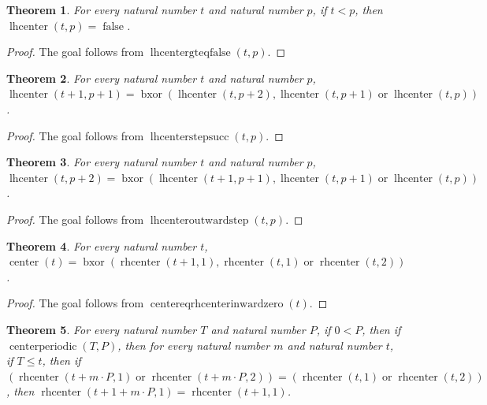 \documentclass[11pt]{article}
\newtheorem{theorem}{Theorem}[section]
\theoremstyle{definition}
\begin{document}
\begin{theorem}
\label{ll:paper:lhcenter-gt-eq-false}
For every natural number \(t\) and natural number \(p\), if \(t < p\), then \(\operatorname{lhcenter}(t, p) = \operatorname{false}\).
\end{theorem}
\begin{proof}
The goal follows from \(\operatorname{lhcentergteqfalse}(t, p)\).
\end{proof}
\begin{theorem}
\label{ll:paper:lhcenter-step-succ}
For every natural number \(t\) and natural number \(p\), \(\operatorname{lhcenter}(t + 1, p + 1) = \operatorname{bxor}(\operatorname{lhcenter}(t, p + 2), \operatorname{lhcenter}(t, p + 1) \operatorname{or} \operatorname{lhcenter}(t, p))\).
\end{theorem}
\begin{proof}
The goal follows from \(\operatorname{lhcenterstepsucc}(t, p)\).
\end{proof}
\begin{theorem}
\label{ll:paper:lhcenter-outward-step}
For every natural number \(t\) and natural number \(p\), \(\operatorname{lhcenter}(t, p + 2) = \operatorname{bxor}(\operatorname{lhcenter}(t + 1, p + 1), \operatorname{lhcenter}(t, p + 1) \operatorname{or} \operatorname{lhcenter}(t, p))\).
\end{theorem}
\begin{proof}
The goal follows from \(\operatorname{lhcenteroutwardstep}(t, p)\).
\end{proof}
\begin{theorem}
\label{ll:paper:center-eq-rhcenter-inward-zero}
For every natural number \(t\), \(\operatorname{center}(t) = \operatorname{bxor}(\operatorname{rhcenter}(t + 1, 1), \operatorname{rhcenter}(t, 1) \operatorname{or} \operatorname{rhcenter}(t, 2))\).
\end{theorem}
\begin{proof}
The goal follows from \(\operatorname{centereqrhcenterinwardzero}(t)\).
\end{proof}
\begin{theorem}
\label{ll:paper:periodic-rhcenter-step-one-eq-of-or-eq}
For every natural number \(T\) and natural number \(P\), if \(0 < P\), then if \(\operatorname{centerperiodic}(T, P)\), then for every natural number \(m\) and natural number \(t\), if \(T \le t\), then if \((\operatorname{rhcenter}(t + m \cdot P, 1) \operatorname{or} \operatorname{rhcenter}(t + m \cdot P, 2)) = (\operatorname{rhcenter}(t, 1) \operatorname{or} \operatorname{rhcenter}(t, 2))\), then \(\operatorname{rhcenter}(t + 1 + m \cdot P, 1) = \operatorname{rhcenter}(t + 1, 1)\).
\end{theorem}
\end{document}
